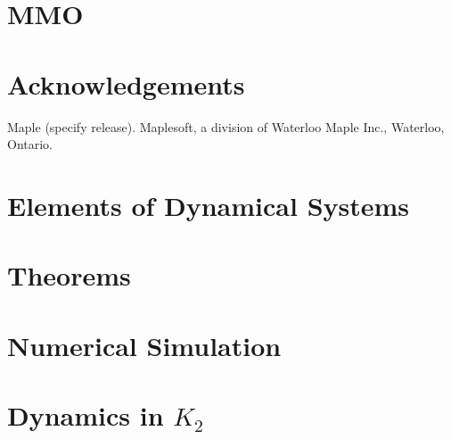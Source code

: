 \documentclass{article}
\begin{document}
\section{MMO}\label{sec:MMO}



\section{Acknowledgements}
Maple (specify release). Maplesoft, a division of Waterloo Maple Inc., Waterloo, Ontario.
\newpage


\nocite{strogatz2007nonlinear}

\newpage
\appendix
\section{Elements of Dynamical Systems}\label{app:DynSys}

\section{Theorems}

%
\section{Numerical Simulation}\label{app:NumSim}

\section{Dynamics in \texorpdfstring{$K_2$}{K2}}
\end{document}
